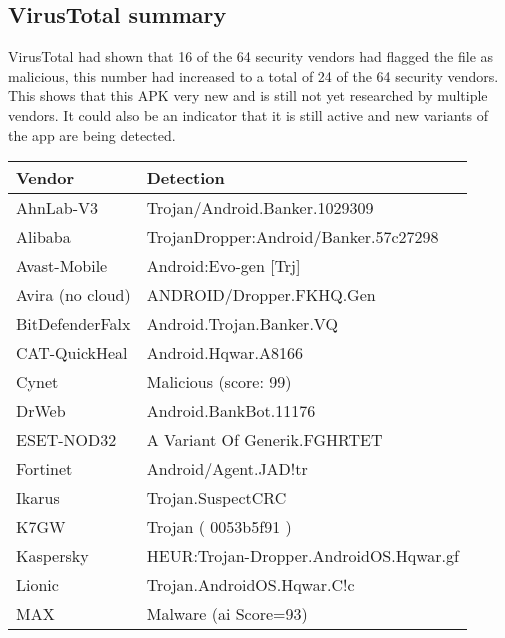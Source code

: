 \subsection{VirusTotal summary}

VirusTotal had shown that 16 of the 64 security vendors had flagged the file as malicious, 
this number had increased to a total of 24 of the 64 security vendors. 
This shows that this APK very new and is still not yet researched by multiple vendors. 
It could also be an indicator that it is still active and new variants of the app are being detected. 

\begin{tabular}{|l|l|}
    \hline
    \textbf{Vendor}          & \textbf{Detection}                     \\ \hline
    AhnLab-V3                & Trojan/Android.Banker.1029309          \\ \hline
    Alibaba                  & TrojanDropper:Android/Banker.57c27298  \\ \hline
    Avast-Mobile             & Android:Evo-gen {[}Trj{]}              \\ \hline
    Avira (no cloud)         & ANDROID/Dropper.FKHQ.Gen               \\ \hline
    BitDefenderFalx          & Android.Trojan.Banker.VQ               \\ \hline
    CAT-QuickHeal            & Android.Hqwar.A8166                    \\ \hline
    Cynet                    & Malicious (score: 99)                  \\ \hline
    DrWeb                    & Android.BankBot.11176                  \\ \hline
    ESET-NOD32               & A Variant Of Generik.FGHRTET           \\ \hline
    Fortinet                 & Android/Agent.JAD!tr                   \\ \hline
    Ikarus                   & Trojan.SuspectCRC                      \\ \hline
    K7GW                     & Trojan ( 0053b5f91 )                   \\ \hline
    Kaspersky                & HEUR:Trojan-Dropper.AndroidOS.Hqwar.gf \\ \hline
    Lionic                   & Trojan.AndroidOS.Hqwar.C!c             \\ \hline
    MAX                      & Malware (ai Score=93)                  \\ \hline

\end{tabular}
